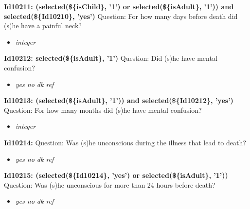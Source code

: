 \documentclass{article}%
\begin{document}
\textbf{Id10211: (selected(\$\{isChild\}, '1') or selected(\$\{isAdult\}, '1')) and selected(\$\{Id10210\}, 'yes')\newline%
}%
Question: For how many days before death did (s)he have a painful neck?\newline%
%
\begin{itemize}%
\item%
\textit{integer\newline%
}%
\end{itemize}%
\textbf{Id10212: selected(\$\{isAdult\}, '1')\newline%
}%
Question: Did (s)he have mental confusion?\newline%
%
\begin{itemize}%
\item%
\textit{yes\newline%
 no\newline%
 dk\newline%
 ref\newline%
}%
\end{itemize}%
\textbf{Id10213: (selected(\$\{isAdult\}, '1')) and selected(\$\{Id10212\}, 'yes')\newline%
}%
Question: For how many months did (s)he have mental confusion?\newline%
%
\begin{itemize}%
\item%
\textit{integer\newline%
}%
\end{itemize}%
\textbf{Id10214: \newline%
}%
Question: Was (s)he unconscious during the illness that lead to death?\newline%
%
\begin{itemize}%
\item%
\textit{yes\newline%
 no\newline%
 dk\newline%
 ref\newline%
}%
\end{itemize}%
\textbf{Id10215: (selected(\$\{Id10214\}, 'yes') or selected(\$\{isAdult\}, '1'))\newline%
}%
Question: Was (s)he unconscious for more than 24 hours before death?\newline%
%
\begin{itemize}%
\item%
\textit{yes\newline%
 no\newline%
 dk\newline%
 ref\newline%
}%
\end{itemize}%
\end{document}
